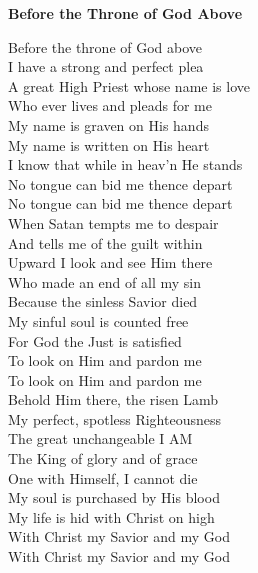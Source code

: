 \textbf{Before the Throne of God Above}

Before the throne of God above \\
I have a strong and perfect plea \\
A great High Priest whose name is love \\
Who ever lives and pleads for me \\
My name is graven on His hands \\
My name is written on His heart \\
I know that while in heav’n He stands \\
No tongue can bid me thence depart \\
No tongue can bid me thence depart \\

When Satan tempts me to despair \\
And tells me of the guilt within \\
Upward I look and see Him there \\
Who made an end of all my sin \\
Because the sinless Savior died \\
My sinful soul is counted free \\
For God the Just is satisfied \\
To look on Him and pardon me \\
To look on Him and pardon me \\

Behold Him there, the risen Lamb \\
My perfect, spotless Righteousness \\
The great unchangeable I AM \\
The King of glory and of grace \\
One with Himself, I cannot die \\
My soul is purchased by His blood \\
My life is hid with Christ on high \\
With Christ my Savior and my God \\
With Christ my Savior and my God \\

